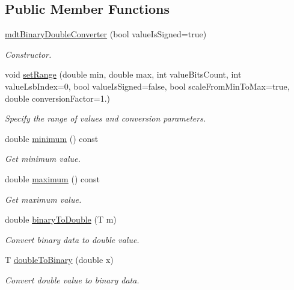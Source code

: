 \subsection*{Public Member Functions}
\begin{DoxyCompactItemize}
\item 
\hyperlink{classmdt_binary_double_converter_aaddde0c66ca0e86fdb3fe8cfecb84820}{mdt\-Binary\-Double\-Converter} (bool value\-Is\-Signed=true)
\begin{DoxyCompactList}\small\item\em Constructor. \end{DoxyCompactList}\item 
void \hyperlink{classmdt_binary_double_converter_a70d19c66c956d698af371990935c4246}{set\-Range} (double min, double max, int value\-Bits\-Count, int value\-Lsb\-Index=0, bool value\-Is\-Signed=false, bool scale\-From\-Min\-To\-Max=true, double conversion\-Factor=1.)
\begin{DoxyCompactList}\small\item\em Specify the range of values and conversion parameters. \end{DoxyCompactList}\item 
double \hyperlink{classmdt_binary_double_converter_aea12d22ccf1297d6086b28286d7dbeae}{minimum} () const 
\begin{DoxyCompactList}\small\item\em Get minimum value. \end{DoxyCompactList}\item 
double \hyperlink{classmdt_binary_double_converter_abe7960617f662603dd841c68855dc1af}{maximum} () const 
\begin{DoxyCompactList}\small\item\em Get maximum value. \end{DoxyCompactList}\item 
double \hyperlink{classmdt_binary_double_converter_a1369ff9f4138f8cd2158c263e5b35ec6}{binary\-To\-Double} (T m)
\begin{DoxyCompactList}\small\item\em Convert binary data to double value. \end{DoxyCompactList}\item 
T \hyperlink{classmdt_binary_double_converter_a4db906f5ab4849681f4ad2dc2fc5183d}{double\-To\-Binary} (double x)
\begin{DoxyCompactList}\small\item\em Convert double value to binary data. \end{DoxyCompactList}\end{DoxyCompactItemize}


